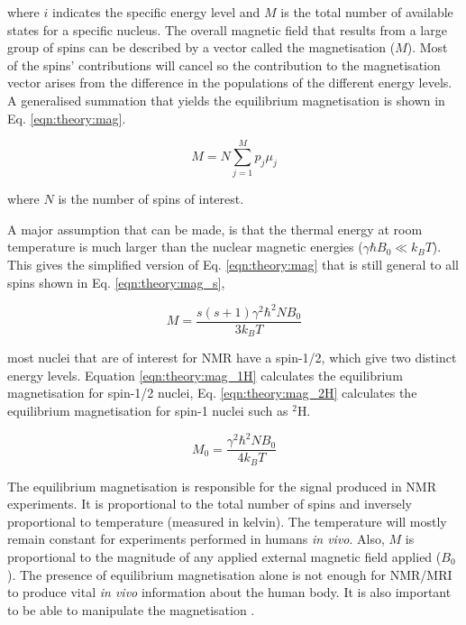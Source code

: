 \noindent where $i$ indicates the specific energy level and $M$ is the total number of available states for a specific nucleus. The overall magnetic field that results from a large group of spins can be described by a vector called the magnetisation ($M$). Most of the spins' contributions will cancel so the contribution to the magnetisation vector arises from the difference in the populations of the different energy levels. A generalised summation that yields the equilibrium magnetisation is shown in Eq. \ref{eqn:theory:mag}.

\begin{equation}
    M = N\sum_{j = 1}^{M}p_j\mu_j
    \label{eqn:theory:mag}
\end{equation}

\noindent where $N$ is the number of spins of interest. 

A major assumption that can be made, is that the thermal energy at room temperature is much larger than the nuclear magnetic energies ($\gamma \hbar B_0\ll k_BT$). This gives the simplified version of Eq. \ref{eqn:theory:mag} that is still general to all spins shown in Eq. \ref{eqn:theory:mag_s},

\begin{equation}
    M = \frac{s(s+1)\gamma^2 \hbar^2 N B_0}{3k_BT}
    \label{eqn:theory:mag_s}
\end{equation}

\noindent most nuclei that are of interest for \ac{NMR} have a spin-1/2, which give two distinct energy levels. Equation \ref{eqn:theory:mag_1H} calculates the equilibrium magnetisation for spin-1/2 nuclei, Eq. \ref{eqn:theory:mag_2H} calculates the equilibrium magnetisation for spin-1 nuclei such as $^2$H.

\begin{equation}
    M_0 = \frac{\gamma^2 \hbar^2 N B_0}{4k_BT}
    \label{eqn:theory:mag_1H}
\end{equation}

The equilibrium magnetisation is responsible for the signal produced in \ac{NMR} experiments. It is proportional to the total number of spins and inversely proportional to temperature (measured in kelvin). The temperature will mostly remain constant for experiments performed in humans \textit{in vivo}. Also, $M$ is proportional to the magnitude of any applied external magnetic field applied ($B_0$). The presence of equilibrium magnetisation alone is not enough for \ac{NMR}/\ac{MRI} to produce vital \textit{in vivo} information about the human body. It is also important to be able to manipulate the magnetisation \cite{Haacke2014MagneticDesign}. 

